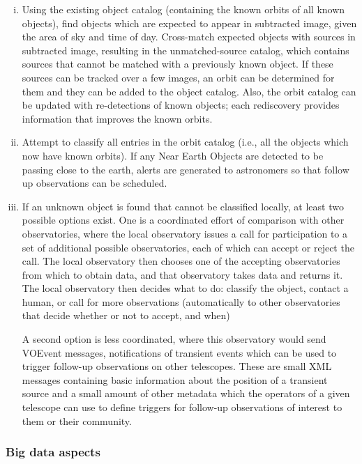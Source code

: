 \begin{enumerate}[(i)]

\item Using the existing object catalog (containing the known orbits of all known objects), find objects which are expected to appear in subtracted image, given the area of sky and time of day.
Cross-match expected objects with sources in subtracted image, resulting in the unmatched-source catalog, which contains sources that cannot be matched with a previously known object.  If these sources can be tracked over a few images, an orbit can be determined for them and they can be added to the object catalog.  Also, the orbit catalog can be updated with re-detections of known objects; each rediscovery provides information that improves the known orbits.

\item Attempt to classify all entries in the orbit catalog (i.e., all the objects which now have known orbits). If any Near Earth Objects are detected to be passing close to the earth, alerts are generated to astronomers so that follow up observations can be scheduled.

\item If an unknown object is found that cannot be classified locally, at least two possible options exist. One is a coordinated effort of comparison with other observatories, where the local observatory issues a call for participation to a set of additional possible observatories, each of which can accept or reject the call.  The local observatory then chooses one of the accepting observatories from which to obtain data, and that observatory takes data and returns it. The local observatory then decides what to do: classify the object, contact a human, or call for more observations (automatically to other observatories that decide whether or not to accept, and when)

A second option is less coordinated, where this observatory would send VOEvent
messages, notifications of transient events which can be used to
trigger follow-up observations on other telescopes. These are small XML messages
containing basic information about the position of a transient source and a
small amount of other metadata which the operators of a given telescope can use
to define triggers for follow-up observations of interest to them or their
community.

\end{enumerate}

 \subsubsection*{Big data aspects}


